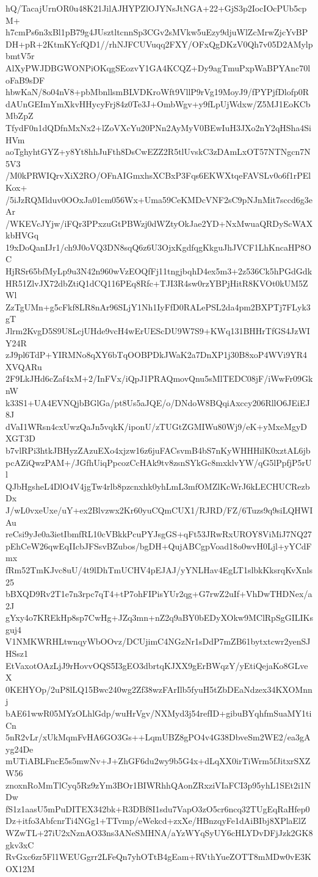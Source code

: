 hQ/TacajUrnOR0u48K21JilAJHYPZlOJYNsJtNGA+22+GjS3p2IocIOcPUb5cpM+
h7cmPs6n3xBl1pB79g4JUsztltcnnSp3CGv2sMVkw5uEzy9djuWlZcMrwZjcYvBP
DH+pR+2KtmKYcfQD1//rhNJFCUVuqq2FXY/OFxQgDKzV0Qh7v05D2AMylpbmtV5r
AlXyPWJDBGWONPiOKqgSEozvY1GA4KCQZ+Dy9agTmuPxpWaBPYAnc70loFaB9sDF
hbwKaN/8o04nV8+pbMbnllsmBLVDKroWft9VllP9rVg19MoyJ9/fPYPjfDlofp0R
dAUnGEImYmXkvHHycyFrj84z0Te3J+OmbWgv+y9fLpUjWdxw/Z5MJ1EoKCbMbZpZ
TfydF0n1dQDfnMxNx2+lZoVXcYu20PNn2AyMyV0BEwIuH3JXo2nY2qHSha4SiHVm
aoTghyhtGYZ+y8Yt8hhJuFth8DsCwEZZ2R5tlUvskC3zDAmLxOT57NTNgcn7N5V3
/M0kPRWIQrvXiX2RO/OFnAIGmxhsXCBxP3Fqs6EKWXtqeFAVSLv0o6f1rPElKox+
/5iJzRQMlduv0OOxJa01cm056Wx+Uma59CeKMDcVNF2sC9pNJnMit7sccd6g3eAr
/WKEVcJYjw/iFQr3PPxzuGtPBWzj0dWZtyOkJae2YD+NxMwuaQRDyScWAXkbHVGq
19xDoQanIJr1/ch9J0oVQ3DN8sqQ6z6U3OjxKgdfqgKkguJhJVCF1LhKncaHP8OC
HjRSr65bfMyLp9u3N42n960wVzEOQfFj11tngjbqhD4ex5m3+2z536Ck5hPGdGdk
HR51ZlvJX72dbZtiQ1dCQ116PEq8Rfc+TJI3R4sw0rzYBPjHitR8KVOt0kUM5ZWl
ZzTgUMn+g5cFkf8LR8nAr96SLjY1Nh1IyFfD0RALePSL2da4pm2BXPTj7FLyk3gT
Jlrm2KvgD5S9U8LcjUHde9vcH4wErUEScDU9W7S9+KWq131BHHrTfGS4JzWIY24R
zJ9pl6TdP+YIRMNo8qXY6bTqOOBPDkJWaK2a7DnXP1j30B8xoP4WVi9YR4XVQARu
2F9LkJHd6cZaf4xM+2/InFVx/iQpJ1PRAQmovQnu5sMlTEDC08jF/iWwFr09GknW
k33S1+UA4EVNQjbBGlGa/pt8Us5aJQE/o/DNdoW8BQqiAxccy206RllO6JEiEJ8J
dVaI1WRsn4cxUwzQaJn5vqkK/iponU/zTUGtZGMIWu80Wj9/eK+yMxeMgyDXGT3D
b7vlRPi3htkJBHyzZAzuEXo4xjzw16z6juFACsvmB4bS7nKyWHHHilK0xztAL6jb
pcAZiQwzPAM+/JGfhUiqPpcozCcHAk9tv8zsnSYkGc8mxklvYW/qG5lPpfjP5rUl
QJbHgsheL4DlO4V4jgTw4rlb8pzcnxhk0yhLmL3mfOMZlKcWrJ6kLECHUCRezbDx
J/wL0vxeUxe/uY+ex2Blvzwx2Kr60yuCQmCUX1/RJRD/FZ/6Tuzs9q9siLQHWIAu
reCsi9yJe0a3ietIbmfRL10cVBkkPcuPYJsgGS+qFt53JRwRxUROY8ViMiJ7NQ27
pEhCeW26qwEqIIcbJFSsvBZubos/bgDH+QujABCgpVoad18o0wvH0Ljl+yYCdFmx
fRm52TmKJvc8uU/4t9lDhTmUCHV4pEJAJ/yYNLHav4EgLT1slbkKksrqKvXnls25
bBXQD9Rv2T1e7n3rpc7qT4+tP7ohFIPisYUr2qg+G7rwZ2uIf+VhDwTHDNex/a2J
gYxy4o7KREkHp8sp7CwHg+JZq3mn+nZ2q9aBY0bEDyXOkw9MClRpSgGILIKsguj4
V1NMKWRHLtwnqyWbOOvz/DCUjimC4NGzNr1sDdP7mZB61bytxtcwr2yenSJHSsz1
EtVaxotOAzLjJ9rHovvOQS5I3gEO3dbrtqKJXX9gErBWqzY/yEtiQejaKo8GLveX
0KEHYOp/2uP8lLQ15Bwc240wg2Zf38wzFArIlb5fyuH5tZbDEaNdzex34KXOMnnj
bAE61wwR05MYzOLhlGdp/wuHrVgv/NXMyd3j54refID+gibuBYqhfmSuaMY1tiCn
5nR2vLr/xUkMqmFvHA6GO3Gs++LqmUBZ8gPO4v4G38DbveSm2WE2/ea3gAyg24De
mUTiABLFncE5s5mwNv+J+ZhGF6du2wy9b5G4x+dLqXX0irTiWrm5fJitxrSXZW56
znoxnRoMmTlCyq5Rz9zYm3BOr1BIWRhhQAonZRxziVIaFCI3p95yhL1SEt2i1NDw
fS1z1aasU5mPuDITEX342bk+R3DBf8I1sdu7VapO3zO5cr6ncq32TUgEqRaHfep0
Dz+itfo3AbfcnrTi4NGg1+TTvmp/eWekcd+zxXe/HBnzqyFe1dAiBIbj8XPlaElZ
WZwTL+27iU2xNznAO33ns3ANeSMHNA/aYzWYqSyUY6cHLYDvDFjJzk2GK8gkv3xC
RvGxc6zr5Fl1WEUGgrr2LFeQn7yhOTtB4gEam+RVthYueZOTT8mMDw0vE3KOX12M
